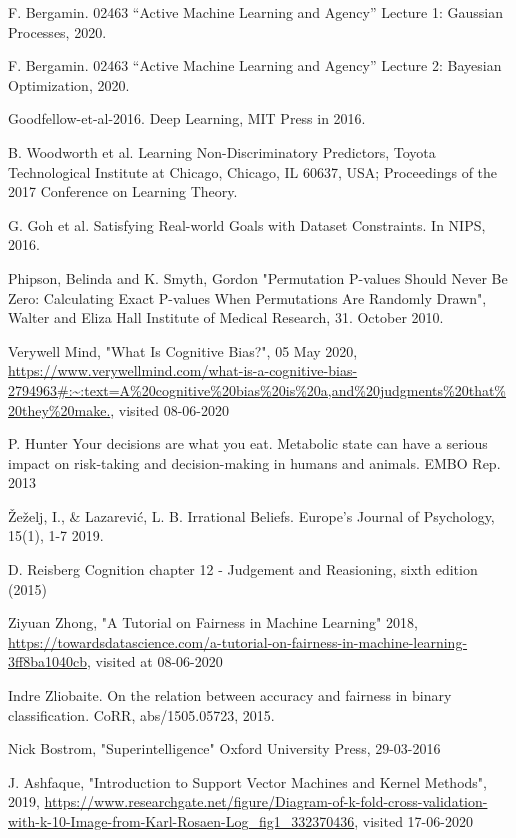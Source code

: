 \documentclass[11pt, fleqn, titlepage]{article}
\begin{document}
\begin{thebibliography}{9}
		 F. Bergamin. 02463 “Active Machine Learning and Agency” Lecture 1: Gaussian Processes, 2020.
		
		 F. Bergamin. 02463 “Active Machine Learning and Agency” Lecture 2: Bayesian Optimization, 2020.
		
		 Goodfellow-et-al-2016. Deep Learning, MIT Press in 2016. 
		
		 B. Woodworth et al. Learning Non-Discriminatory Predictors, Toyota Technological Institute at Chicago, Chicago, IL 60637, USA; Proceedings of the 2017 Conference on Learning Theory.
		
		 G. Goh et al. Satisfying Real-world Goals with Dataset Constraints. In NIPS, 2016.
		
		 Phipson, Belinda and K. Smyth, Gordon "Permutation P-values Should Never Be Zero: Calculating Exact P-values When Permutations Are Randomly Drawn", Walter and Eliza Hall Institute of Medical Research, 31. October 2010.
		
		 Verywell Mind, "What Is Cognitive Bias?", 05 May 2020,
		\url{https://www.verywellmind.com/what-is-a-cognitive-bias-2794963#:~:text=A%20cognitive%20bias%20is%20a,and%20judgments%20that%20they%20make.}, visited 08-06-2020
		
		 P. Hunter Your decisions are what you eat. Metabolic state can have a serious impact on risk-taking and decision-making in humans and animals. EMBO Rep. 2013
		
		 Žeželj, I., \& Lazarević, L. B.  Irrational Beliefs. Europe’s Journal of Psychology, 15(1), 1-7 2019.
		
		 D. Reisberg Cognition chapter 12 - Judgement and Reasioning, sixth edition (2015)
		
		 Ziyuan Zhong, "A Tutorial on Fairness in Machine Learning" 2018, \url{https://towardsdatascience.com/a-tutorial-on-fairness-in-machine-learning-3ff8ba1040cb}, visited at 08-06-2020
		
		 Indre Zliobaite. On the relation between accuracy and fairness in binary classification. CoRR, abs/1505.05723, 2015.
		
		 Nick Bostrom, "Superintelligence" Oxford University Press, 29-03-2016
		
		 J. Ashfaque, "Introduction to Support Vector Machines and Kernel Methods", 2019, \url{https://www.researchgate.net/figure/Diagram-of-k-fold-cross-validation-with-k-10-Image-from-Karl-Rosaen-Log_fig1_332370436}, visited 17-06-2020
		

\end{thebibliography}
\end{document}
